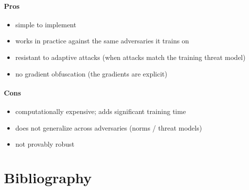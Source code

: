\documentclass[11pt]{report}
\begin{document}
\paragraph{Pros}
\begin{itemize}
    \item simple to implement
    \item works in practice against the same adversaries it trains on
    \item resistant to adaptive attacks (when attacks match the training threat model)
    \item no gradient obfuscation (the gradients are explicit)
\end{itemize}

\paragraph{Cons}
\begin{itemize}
    \item computationally expensive; adds significant training time
    \item does not generalize across adversaries (norms / threat models)
    \item not provably robust
\end{itemize}

\section*{Bibliography}
\end{document}
